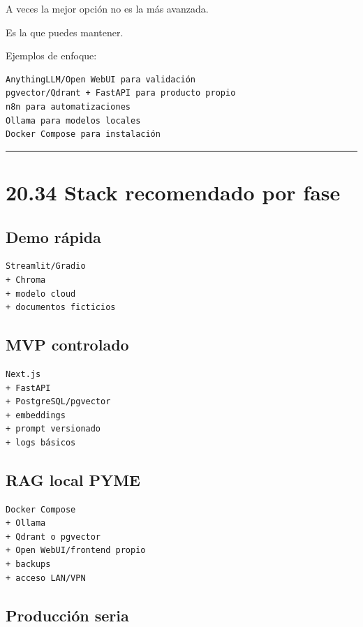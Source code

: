 A veces la mejor opción no es la más avanzada.

Es la que puedes mantener.

Ejemplos de enfoque:

\begin{lstlisting}
AnythingLLM/Open WebUI para validación
pgvector/Qdrant + FastAPI para producto propio
n8n para automatizaciones
Ollama para modelos locales
Docker Compose para instalación
\end{lstlisting}

\begin{center}\rule{0.5\linewidth}{0.5pt}\end{center}

\section{20.34 Stack recomendado por
fase}\label{stack-recomendado-por-fase}

\subsection{Demo rápida}\label{demo-ruxe1pida}

\begin{lstlisting}
Streamlit/Gradio
+ Chroma
+ modelo cloud
+ documentos ficticios
\end{lstlisting}

\subsection{MVP controlado}\label{mvp-controlado}

\begin{lstlisting}
Next.js
+ FastAPI
+ PostgreSQL/pgvector
+ embeddings
+ prompt versionado
+ logs básicos
\end{lstlisting}

\subsection{RAG local PYME}\label{rag-local-pyme}

\begin{lstlisting}
Docker Compose
+ Ollama
+ Qdrant o pgvector
+ Open WebUI/frontend propio
+ backups
+ acceso LAN/VPN
\end{lstlisting}

\subsection{Producción seria}\label{producciuxf3n-seria}

